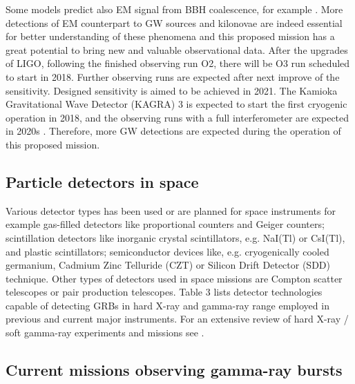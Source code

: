 \documentclass[12pt, a4paper,titlepage]{article}
\numberwithin{equation}{section}
\numberwithin{figure}{section}
\begin{document}
Some models predict also EM signal from BBH coalescence, for example \cite{grb25}. More detections of EM counterpart to GW sources and kilonovae are indeed essential for better understanding of these phenomena and this proposed mission has a great potential to bring new and valuable observational data.
After the upgrades of LIGO, following the finished observing run O2, there will be O3 run scheduled to start in 2018. Further observing runs are expected after next improve of the sensitivity. Designed sensitivity is aimed to be achieved in 2021. The Kamioka Gravitational Wave Detector (KAGRA) 3 is expected to start the first cryogenic operation in 2018, and the observing runs with a full interferometer are expected in 2020s \cite{grb26}. Therefore, more GW detections are expected during the operation of this proposed mission.

\subsection{Particle detectors in space}

Various detector types has been used or are planned for space instruments for example gas-filled detectors like proportional counters and Geiger counters; scintillation detectors like inorganic crystal scintillators, e.g. NaI(Tl) or CsI(Tl), and plastic scintillators; semiconductor devices like, e.g. cryogenically cooled germanium, Cadmium Zinc Telluride (CZT) or Silicon Drift Detector (SDD) technique. Other types of detectors used in space missions are Compton scatter telescopes or pair production telescopes. Table 3 lists detector technologies capable of detecting GRBs in hard X-ray and gamma-ray range employed in previous and current major instruments. For an extensive review of hard X-ray / soft gamma-ray experiments and missions see \cite{grb30}.

\subsection{Current missions observing gamma-ray bursts}
\end{document}
